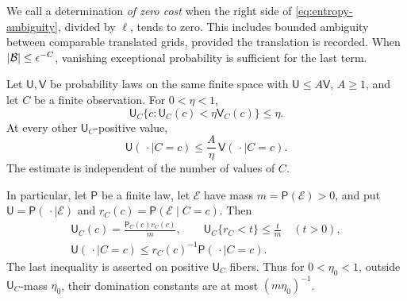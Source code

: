 We call a determination \emph{of zero cost} when the right side of
\eqref{eq:entropy-ambiguity}, divided by $\ell$, tends to zero.
This includes bounded ambiguity between comparable translated grids,
provided the translation is recorded.  When $|\mathcal B|\le\epsilon^{-C}$,
vanishing exceptional probability is sufficient for the last term.

\begin{lemma}
\label{lem:typical-conditioning}
Let $\mathsf U,\mathsf V$ be probability laws on the same finite space
with $\mathsf U\le A\mathsf V$, $A\ge1$, and let $C$ be a finite observation.
For $0<\eta<1$,
\begin{equation}
 \mathsf U_C\{c:\mathsf U_C(c)<\eta\mathsf V_C(c)\}\le\eta.
 \label{eq:conditioning-likelihood}
\end{equation}
At every other $\mathsf U_C$-positive value,
\[
 \mathsf U(\,\cdot\mid C=c)
 \le \frac A\eta\,\mathsf V(\,\cdot\mid C=c).
\]
The estimate is independent of the number of values of $C$.

In particular, let $\mathsf P$ be a finite law, let $\mathcal E$ have
mass $m=\mathsf P(\mathcal E)>0$, and put
$\mathsf U=\mathsf P(\,\cdot\mid\mathcal E)$ and
$r_C(c)=\mathsf P(\mathcal E\mid C=c)$.  Then
\begin{equation}
 \begin{gathered}
 \mathsf U_C(c)=\frac{\mathsf P_C(c)r_C(c)}m,\qquad
 \mathsf U_C\{r_C<t\}\le\frac tm\quad(t>0),\\
 \mathsf U(\,\cdot\mid C=c)
 \le r_C(c)^{-1}\mathsf P(\,\cdot\mid C=c).
 \end{gathered}
 \label{eq:retention-fibers}
\end{equation}
The last inequality is asserted on positive $\mathsf U_C$ fibers.
Thus for $0<\eta_0<1$, outside $\mathsf U_C$-mass $\eta_0$, their
domination constants are at most $(m\eta_0)^{-1}$.


\end{lemma}
